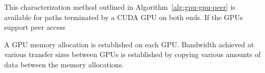 

This characterization method outlined in Algorithm~\ref{alg:gpu-gpu-peer} is available for paths terminated by a CUDA GPU on both ends.
If the GPUs support peer access

A GPU memory allocation is established on each GPU.
Bandwidth achieved at various transfer sizes between GPUs is established by copying various amounts of data between the memory allocations.


